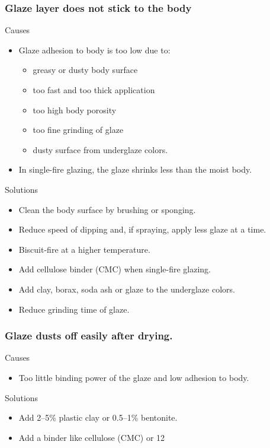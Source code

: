 \subsubsection{Glaze layer does not stick to the body}
Causes
\begin{itemize}
\item Glaze adhesion to body is too low due to:
\begin{itemize}
\item greasy or dusty body surface
\item too fast and too thick application
\item too high body porosity
\item too fine grinding of glaze
\item dusty surface from underglaze colors.
\end{itemize}
\item In single-fire glazing, the glaze shrinks less than the moist body.
\end{itemize}
Solutions
\begin{itemize}
\item Clean the body surface by brushing or sponging.
\item Reduce speed of dipping and, if spraying, apply less glaze at a time.
\item Biscuit-fire at a higher temperature.
\item Add cellulose binder (CMC) when single-fire glazing.
\item Add clay, borax, soda ash or glaze to the underglaze colors.
\item Reduce grinding time of glaze.
\end{itemize}
\subsubsection{Glaze dusts off easily after drying.}
Causes
\begin{itemize}
\item Too little binding power of the glaze and low adhesion to body.
\end{itemize}
Solutions
\begin{itemize}
\item Add 2--5\% plastic clay or 0.5--1\% bentonite.
\item Add a binder like cellulose (CMC) or 12%
\end{itemize}

